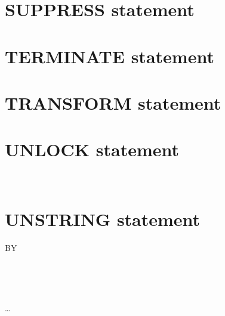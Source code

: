 \section{SUPPRESS statement}


\section{TERMINATE statement}


\section{TRANSFORM statement}


\section{UNLOCK statement}

 \filename
\begin{0-1}
   \\
\end{0-1}

\section{UNSTRING statement}

 \identifier

\begin{0-1}
   BY
  \begin{0-1}
  \end{0-1}
  \begin{1=}
    \identifier \\
    \literal
  \end{1=}
  \begin{1=}
    \begin{0-1}
    \end{0-1}
    \begin{1=}
      \identifier \\
      \literal
    \end{1=}
  \end{1=} \ldots
\end{0-1}

